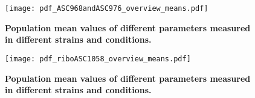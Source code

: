 \begin{figure}
    \centering
        \texttt{[image: pdf\_ASC968andASC976\_overview\_means.pdf]}
    \caption{ 
        \textbf{Population mean values of different parameters measured in different strains and conditions.}
    }
    \label{fig:ribo:CCsPmuY}
\end{figure}

\begin{figure}
    \centering
    \texttt{[image: pdf\_riboASC1058\_overview\_means.pdf]}
    \caption{ 
        \textbf{Population mean values of different parameters measured in different strains and conditions.}
    }
    \label{fig:ribo:CCsPmuY}
\end{figure}




